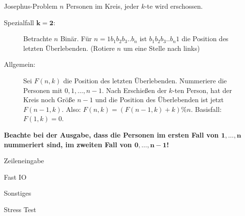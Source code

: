 \begin{algorithm}{Josephus-Problem}
	$n$ Personen im Kreis, jeder $k$-te wird erschossen.
	\begin{description}
		\item[Spezialfall $\boldsymbol{k=2}$:] Betrachte $n$ Binär.
		Für $n = 1b_1b_2b_3..b_n$ ist $b_1b_2b_3..b_n1$ die Position des letzten Überlebenden.
		(Rotiere $n$ um eine Stelle nach links)
	\end{description}
	
	\begin{description}
		\item[Allgemein:] Sei $F(n,k)$ die Position des letzten Überlebenden.
		Nummeriere die Personen mit $0, 1, \ldots, n-1$.
		Nach Erschießen der $k$-ten Person, hat der Kreis noch Größe $n-1$ und die Position des Überlebenden ist jetzt $F(n-1,k)$.
		Also: $F(n,k) = (F(n-1,k)+k)\%n$. Basisfall: $F(1,k) = 0$.
	\end{description}
	\textbf{Beachte bei der Ausgabe, dass die Personen im ersten Fall von $\boldsymbol{1, \ldots, n}$ nummeriert sind, im zweiten Fall von $\boldsymbol{0, \ldots, n-1}$!}
\end{algorithm}

\begin{algorithm}[optional]{Zeileneingabe}
\end{algorithm}

\begin{algorithm}[optional]{Fast IO}
\end{algorithm}

\begin{algorithm}{Sonstiges}
\end{algorithm}

\begin{algorithm}{Stress Test}
\end{algorithm}

\clearpage
